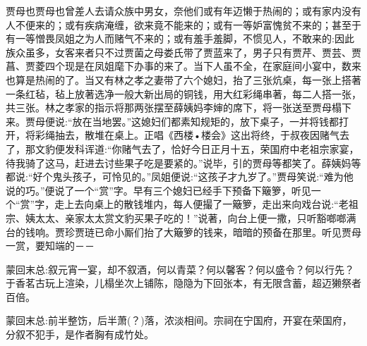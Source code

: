 \begin{parag}
    贾母也贾母也曾差人去请众族中男女，奈他们或有年迈懒于热闹的；或有家内没有人不便来的；或有疾病淹缠，欲来竟不能来的；或有一等妒富愧贫不来的；甚至于有一等憎畏凤姐之为人而赌气不来的；或有羞手羞脚，不惯见人，不敢来的:因此族众虽多，女客来者只不过贾菌之母娄氏带了贾蓝来了，男子只有贾芹、贾芸、贾菖、贾菱四个现是在凤姐麾下办事的来了。当下人虽不全，在家庭间小宴中，数来也算是热闹的了。当又有林之孝之妻带了六个媳妇，抬了三张炕桌，每一张上搭著一条红毡，毡上放著选净一般大新出局的铜钱，用大红彩绳串著，每二人搭一张，共三张。林之孝家的指示将那两张摆至薛姨妈李婶的席下，将一张送至贾母榻下来。贾母便说:“放在当地罢。”这媳妇们都素知规矩的，放下桌子，一并将钱都打开，将彩绳抽去，散堆在桌上。正唱《西楼•楼会》这出将终，于叔夜因赌气去了，那文豹便发科诨道:“你赌气去了，恰好今日正月十五，荣国府中老祖宗家宴，待我骑了这马，赶进去讨些果子吃是要紧的。”说毕，引的贾母等都笑了。薛姨妈等都说:“好个鬼头孩子，可怜见的。”凤姐便说:“这孩子才九岁了。”贾母笑说:“难为他说的巧。”便说了一个“赏”字。早有三个媳妇已经手下预备下簸箩，听见一个“赏”字，走上去向桌上的散钱堆内，每人便撮了一簸箩，走出来向戏台说:“老祖宗、姨太太、亲家太太赏文豹买果子吃的！”说著，向台上便一撒，只听豁啷啷满台的钱响。贾珍贾琏已命小厮们抬了大簸箩的钱来，暗暗的预备在那里。听见贾母一赏，要知端的－－
\end{parag}


\begin{parag}
    \begin{note}蒙回末总:叙元宵一宴，却不叙酒，何以青菜？何以馨客？何以盛令？何以行先？于香茗古玩上渲染，儿榻坐次上铺陈，隐隐为下回张本，有无限含蓄，超迈獭祭者百倍。\end{note}
\end{parag}


\begin{parag}
    \begin{note}蒙回末总:前半整饬，后半萧(？)落，浓淡相间。宗祠在宁国府，开宴在荣国府，分叙不犯手，是作者胸有成竹处。\end{note}
\end{parag}

